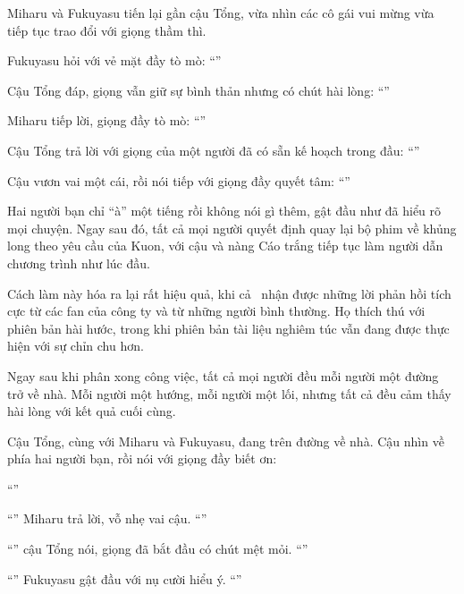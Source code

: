 \documentclass[../main.tex]{subfiles}
\begin{document}
Miharu và Fukuyasu tiến lại gần cậu Tổng, vừa nhìn các cô gái vui mừng vừa tiếp tục trao đổi với giọng thầm thì.

Fukuyasu hỏi với vẻ mặt đầy tò mò: ``''

Cậu Tổng đáp, giọng vẫn giữ sự bình thản nhưng có chút hài lòng: ``''

Miharu tiếp lời, giọng đầy tò mò: ``''

Cậu Tổng trả lời với giọng của một người đã có sẵn kế hoạch trong đầu: ``''

Cậu vươn vai một cái, rồi nói tiếp với giọng đầy quyết tâm: ``''

Hai người bạn chỉ ``à'' một tiếng rồi không nói gì thêm, gật đầu như đã hiểu rõ mọi chuyện. Ngay sau đó, tất cả mọi người quyết định quay lại bộ phim về khủng long theo yêu cầu của Kuon, với cậu và nàng Cáo trắng tiếp tục làm người dẫn chương trình như lúc đầu.

Cách làm này hóa ra lại rất hiệu quả, khi cả \hll\ nhận được những lời phản hồi tích cực từ các fan của công ty và từ những người bình thường. Họ thích thú với phiên bản hài hước, trong khi phiên bản tài liệu nghiêm túc vẫn đang được thực hiện với sự chỉn chu hơn.

\il

Ngay sau khi phân xong công việc, tất cả mọi người đều mỗi người một đường trở về nhà. Mỗi người một hướng, mỗi người một lối, nhưng tất cả đều cảm thấy hài lòng với kết quả cuối cùng.

Cậu Tổng, cùng với Miharu và Fukuyasu, đang trên đường về nhà. Cậu nhìn về phía hai người bạn, rồi nói với giọng đầy biết ơn:

``''

``'' Miharu trả lời, vỗ nhẹ vai cậu. ``''

``'' cậu Tổng nói, giọng đã bắt đầu có chút mệt mỏi. ``''

``'' Fukuyasu gật đầu với nụ cười hiểu ý. ``''
\end{document}

